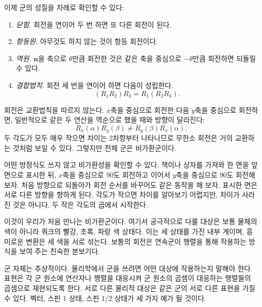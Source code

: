 이제 군의 성질을 차례로 확인할 수 있다:
\begin{enumerate}
\item \emph{닫힘.} 회전을 연이어 두 번 하면 또 다른 회전이 된다.
\item \emph{항등원.} 아무것도 하지 않는 것이 항등 회전이다.
\item \emph{역원.} \(\hat{\boldsymbol n}\)을 축으로 \(\theta\)만큼 회전한 것은 같은 축을 중심으로 \(-\theta\)만큼 회전하면 되돌릴 수 있다.
\item \emph{결합법칙.} 회전 세 번을 연이어 하면 다음이 성립한다.
\[
(R_1R_2)R_3=R_1(R_2R_3).
\]
\end{enumerate}

회전은 교환법칙을 따르지 않는다. \(x\)축을 중심으로 회전한 다음 \(y\)축을 중심으로 회전하면, 일반적으로 같은 두 연산을 역순으로 했을 때와 방향이 달라진다:
\begin{equation}
R_x(\alpha)R_y(\beta)\ne R_y(\beta)R_x(\alpha).
\end{equation}
두 각도가 모두 매우 작으면 차이는 2차항부터 나타나므로 무한소 회전은 거의 교환하는 것처럼 보일 수 있다. 그렇지만 전체 군은 비가환군이다.

어떤 방정식도 쓰지 않고 비가환성을 확인할 수 있다. 책이나 상자를 가져와 한 면을 앞면으로 표시한 뒤, \(x\)축을 중심으로 90도 회전하고 이어서 \(y\)축을 중심으로 90도 회전해 보자. 처음 방향으로 되돌아가 회전 순서를 바꾸어도 같은 동작을 해 보자. 표시한 면은 서로 다른 방향을 향하게 된다. 각도가 작으면 차이를 알아보기 어렵지만, 차이가 사라진 것은 아니다. 두 작은 각도의 곱에서 시작한다.

\begin{classroomqa}
\end{classroomqa}

이것이 우리가 처음 만나는 비가환군이다. 여기서 궁극적으로 다룰 대상은 보통 물체의 색이 아니라 쿼크의 빨강, 초록, 파랑 색 상태다. 이는 세 상태를 가진 내부 계이며, 흥미로운 변환은 세 색을 서로 섞는다. 보통의 회전은 연속군이 행렬을 통해 작용하는 방식을 보여 주는 친숙한 본보기다.

군 자체는 추상적이다. 물리학에서 군을 쓰려면 어떤 대상에 작용하는지 말해야 한다. {표현}은 각 군 원소에 연산자나 행렬을 대응시켜 군 원소의 곱셈이 대응하는 행렬들의 곱셈으로 재현되도록 한다. 서로 다른 물리적 대상은 같은 군의 서로 다른 표현을 가질 수 있다. 벡터, 스핀 1 상태, 스핀 1/2 상태가 세 가지 예가 될 것이다.

